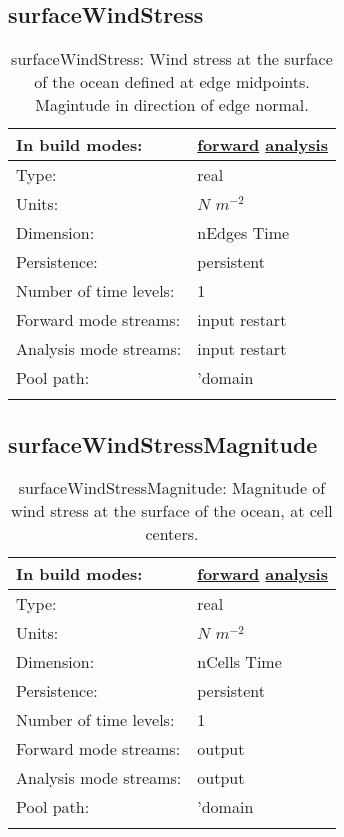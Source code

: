\subsection[surfaceWindStress]{surfaceWindStress}
\label{subsec:var_sec_forcing_surfaceWindStress}
\begin{center}
\begin{longtable}{| p{2.0in} | p{4.0in} |}
        \hline 
        In build modes: & \hyperref[subsec:forward_var_tab_forcing]{forward} \hyperref[subsec:analysis_var_tab_forcing]{analysis} \\
        \hline 
        Type: & real \\
        \hline 
        Units: & $N$ $m^{-2}$ \\
        \hline 
        Dimension: & nEdges Time \\
        \hline 
        Persistence: & persistent \\
        \hline 
        Number of time levels: & 1 \\
        \hline 
		 Forward mode streams: &  input restart \\
        \hline 
		 Analysis mode streams: &  input restart \\
        \hline 
            Pool path: & 'domain %
 \\
		 \hline 
    \caption{surfaceWindStress: Wind stress at the surface of the ocean defined at edge midpoints. Magintude in direction of edge normal.}
\end{longtable}
\end{center}
\subsection[surfaceWindStressMagnitude]{surfaceWindStressMagnitude}
\label{subsec:var_sec_forcing_surfaceWindStressMagnitude}
\begin{center}
\begin{longtable}{| p{2.0in} | p{4.0in} |}
        \hline 
        In build modes: & \hyperref[subsec:forward_var_tab_forcing]{forward} \hyperref[subsec:analysis_var_tab_forcing]{analysis} \\
        \hline 
        Type: & real \\
        \hline 
        Units: & $N$ $m^{-2}$ \\
        \hline 
        Dimension: & nCells Time \\
        \hline 
        Persistence: & persistent \\
        \hline 
        Number of time levels: & 1 \\
        \hline 
		 Forward mode streams: &  output \\
        \hline 
		 Analysis mode streams: &  output \\
        \hline 
            Pool path: & 'domain %
 \\
		 \hline 
    \caption{surfaceWindStressMagnitude: Magnitude of wind stress at the surface of the ocean, at cell centers.}
\end{longtable}
\end{center}
